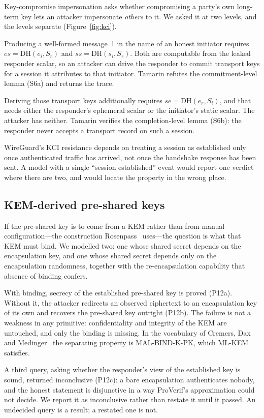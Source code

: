 Key-compromise impersonation asks whether compromising a party's own long-term
key lets an attacker impersonate \emph{others} to it. We asked it at two
levels, and the levels separate (Figure~\ref{fig:kci}).

 Producing a well-formed message~1 in the
name of an honest initiator requires \(es=\mathrm{DH}(e_i,S_r)\) and
\(ss=\mathrm{DH}(s_i,S_r)\). Both are computable from the leaked responder
scalar, so an attacker can drive the responder to commit transport keys for a
session it attributes to that initiator. Tamarin refutes the
commitment-level lemma (S6a) and returns the trace.

 Deriving those transport keys
additionally requires \(se=\mathrm{DH}(e_r,S_i)\), and that needs either the
responder's ephemeral scalar or the initiator's static scalar. The attacker
has neither. Tamarin verifies the completion-level lemma (S6b): the responder
never accepts a transport record on such a session.

 WireGuard's KCI resistance depends
on treating a session as established only once authenticated traffic has
arrived, not once the handshake response has been sent. A model with a single
``session established'' event would report one verdict where there are two,
and would locate the property in the wrong place.

\subsection{KEM-derived pre-shared keys}

If the pre-shared key is to come from a KEM rather than from manual
configuration---the construction Rosenpass~\cite{rosenpass2023} uses---the
question is what that KEM must bind. We modelled two: one whose shared secret
depends on the encapsulation key, and one whose shared secret depends only on
the encapsulation randomness, together with the re-encapsulation capability
that absence of binding confers.

 With binding, secrecy of the established
pre-shared key is proved (P12a). Without it, the attacker redirects an
observed ciphertext to an encapsulation key of its own and recovers the
pre-shared key outright (P12b). The failure is not a weakness in any
primitive: confidentiality and integrity of the KEM are untouched, and only
the binding is missing. In the vocabulary of Cremers, Dax and
Medinger~\cite{cremers2024kembinding} the separating property is
MAL-BIND-K-PK, which ML-KEM satisfies.

 A third query, asking whether the
responder's view of the established key is sound, returned inconclusive
(P12c): a bare encapsulation authenticates nobody, and the honest statement is
disjunctive in a way ProVerif's approximation could not decide. We report it
as inconclusive rather than restate it until it passed. An undecided query is
a result; a restated one is not.
